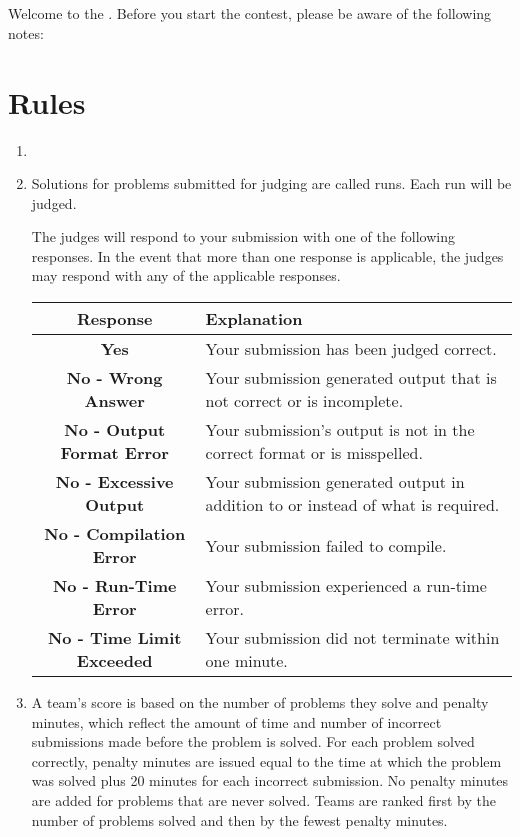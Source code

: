 \section*{\thelongtitle}

Welcome to the \thelongtitle. Before you
start the contest, please be aware of the following notes:

\section*{Rules}

\begin{enumerate}

\item \introbullet

\problemtable

\item Solutions for problems submitted for judging are called
  runs. Each run will be judged.

The judges will respond to your submission with one of the following
responses. In the event that more than one response is applicable, the
judges may respond with any of the applicable responses.

\begin{center}
\begin{tabular}{|c|p{4in}|}\hline
\bf Response & \bf Explanation \\ \hline \hline
\bf Yes & Your submission has been judged correct. \\
\bf No - Wrong Answer & Your submission generated output that is not correct or is incomplete. \\
\bf No - Output Format Error & Your submission's output is not in the correct format or is misspelled. \\
\bf No - Excessive Output & Your submission generated output in addition to or instead of what is required. \\
\bf No - Compilation Error & Your submission failed to compile. \\
\bf No - Run-Time Error & Your submission experienced a run-time error. \\
\bf No - Time Limit Exceeded & Your submission did not terminate within one minute. \\ \hline
\end{tabular}
\end{center}

\item A team's score is based on the number of problems they solve and
  penalty minutes, which reflect the amount of time and number of
  incorrect submissions made before the problem is solved. For each
  problem solved correctly, penalty minutes are issued equal to the
  time at which the problem was solved plus 20 minutes for each
  incorrect submission. No penalty minutes are added for problems that
  are never solved. Teams are ranked first by the number of problems
  solved and then by the fewest penalty minutes.


\end{enumerate}
